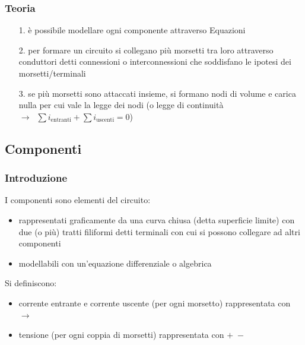 \documentclass[a4paper]{article}
\begin{document}
\subsubsection*{Teoria}
\begin{itemize}
	\item[1.] è possibile modellare ogni componente attraverso Equazioni
	\item[2.] per formare un circuito si collegano più morsetti tra loro attraverso conduttori detti connessioni o interconnessioni
	che soddisfano le ipotesi dei morsetti/terminali
	\item[3.] se più morsetti sono attaccati insieme, si formano nodi di volume e carica nulla per cui vale la legge dei nodi (o legge
	di continuità \(\rightarrow \;\; \sum i_\text{entranti} + \sum i_\text{uscenti} = 0\))
\end{itemize}

\subsection{Componenti}
\subsubsection*{Introduzione}
I componenti sono elementi del circuito:
\begin{itemize}
	\item rappresentati graficamente da una curva chiusa (detta superficie limite) con due (o più) tratti filiformi detti terminali
	con cui si possono collegare ad altri componenti
	\item modellabili con un'equazione differenziale o algebrica
\end{itemize}
Si definiscono:
\begin{itemize}
	\item corrente entrante e corrente uscente (per ogni morsetto) rappresentata con \(\rightarrow\)
	\item tensione (per ogni coppia di morsetti) rappresentata con \(+ \; -\)
\end{itemize}
\end{document}
